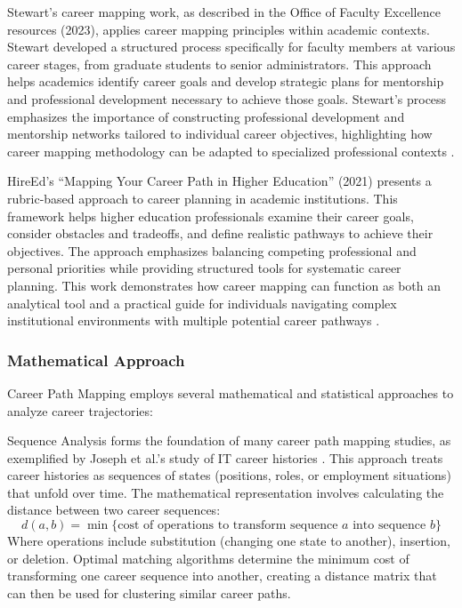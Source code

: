 \documentclass[../main.tex]{subfiles}
\begin{document}
Stewart's career mapping work, as described in the Office of Faculty Excellence resources (2023), applies career mapping principles within academic contexts. Stewart developed a structured process specifically for faculty members at various career stages, from graduate students to senior administrators. This approach helps academics identify career goals and develop strategic plans for mentorship and professional development necessary to achieve those goals. Stewart's process emphasizes the importance of constructing professional development and mentorship networks tailored to individual career objectives, highlighting how career mapping methodology can be adapted to specialized professional contexts \parencite{ncsu2023}.

HireEd's ``Mapping Your Career Path in Higher Education'' (2021) presents a rubric-based approach to career planning in academic institutions. This framework helps higher education professionals examine their career goals, consider obstacles and tradeoffs, and define realistic pathways to achieve their objectives. The approach emphasizes balancing competing professional and personal priorities while providing structured tools for systematic career planning. This work demonstrates how career mapping can function as both an analytical tool and a practical guide for individuals navigating complex institutional environments with multiple potential career pathways \parencite{hireed2021}.

\subsubsection{Mathematical Approach}
Career Path Mapping employs several mathematical and statistical approaches to analyze career trajectories:

Sequence Analysis forms the foundation of many career path mapping studies, as exemplified by Joseph et al.'s study of IT career histories \parencite{joseph2012}. This approach treats career histories as sequences of states (positions, roles, or employment situations) that unfold over time. The mathematical representation involves calculating the distance between two career sequences:
\[
d(a, b) = \min \{\text{cost of operations to transform sequence } a \text{ into sequence } b\}
\]
Where operations include substitution (changing one state to another), insertion, or deletion. Optimal matching algorithms determine the minimum cost of transforming one career sequence into another, creating a distance matrix that can then be used for clustering similar career paths.
\end{document}
